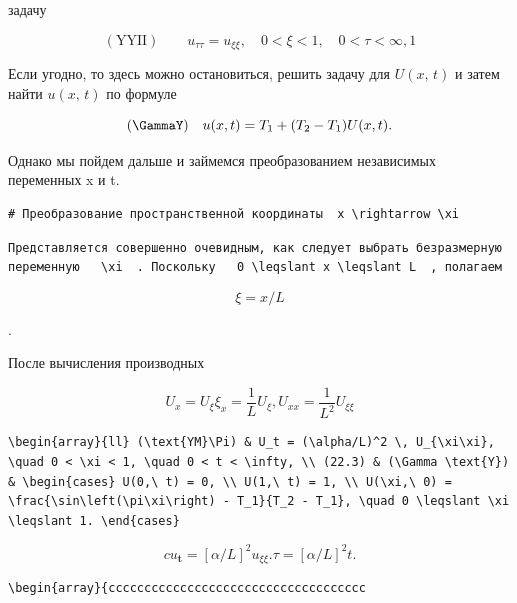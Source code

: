 \documentclass[
  ukrainian,
]{article}
\begin{document}
задачу

\[
(\text{YYII}) \qquad u_{\tau\tau} = u_{\xi\xi}, \quad 0 < \xi < 1, \quad 0 < \tau < \infty, 1
\]

Если угодно, то здесь можно остановиться, решить задачу для
\(U\left(x,\, t\right)\) и затем найти \(u\left(x,\,t\right)\) по
формуле

\[
(\text{\GammaY}) \quad
u(x, t) = T_1 + (T_2 - T_1) U(x, t).
\]

Однако мы пойдем дальше и займемся преобразованием независимых
переменных x и t.

\begin{verbatim}
# Преобразование пространственной координаты  x \rightarrow \xi
\end{verbatim}

\begin{verbatim}
Представляется совершенно очевидным, как следует выбрать безразмерную переменную   \xi  . Поскольку   0 \leqslant x \leqslant L  , полагаем
\end{verbatim}

\[
\xi = x/L
\]

.

После вычисления производных

\[
U_x = U_{\xi} \xi_x = \frac{1}{L} U_{\xi},
U_{xx} = \frac{1}{L^2} U_{\xi\xi}
\]

\begin{verbatim}
\begin{array}{ll} (\text{YM}\Pi) & U_t = (\alpha/L)^2 \, U_{\xi\xi}, \quad 0 < \xi < 1, \quad 0 < t < \infty, \\ (22.3) & (\Gamma \text{Y}) & \begin{cases} U(0,\ t) = 0, \\ U(1,\ t) = 1, \\ U(\xi,\ 0) = \frac{\sin\left(\pi\xi\right) - T_1}{T_2 - T_1}, \quad 0 \leqslant \xi \leqslant 1. \end{cases}
\end{verbatim}

\[
cu_{\mathbf{t}} = [\alpha/L]^2 u_{\xi\xi}.
\tau = [\alpha/L]^2 t.
\]

\begin{verbatim}
\begin{array}{cccccccccccccccccccccccccccccccccccc
\end{verbatim}
\end{document}
